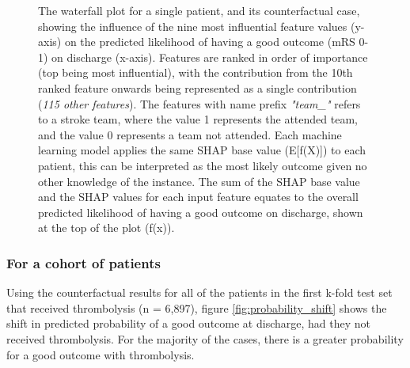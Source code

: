\begin{figure}[h]
\begin{subfigure}[t]{0.5\textwidth}
        \label{fig:rhs_waterfall_without_ivt}
    \end{subfigure}
  \caption{The waterfall plot for a single patient, and its counterfactual case, showing the influence of the nine most influential feature values (y-axis) on the predicted likelihood of having a good outcome (mRS 0-1) on discharge (x-axis). Features are ranked in order of importance (top being most influential), with the contribution from the 10th ranked feature onwards being represented as a single contribution (\textit{115 other features}). The features with name prefix \textit{"team\_"} refers to a stroke team, where the value 1 represents the attended team, and the value 0 represents a team not attended. Each machine learning model applies the same SHAP base value (E[f(X)]) to each patient, this can be interpreted as the most likely outcome given no other knowledge of the instance. The sum of the SHAP base value and the SHAP values for each input feature equates to the overall predicted likelihood of having a good outcome on discharge, shown at the top of the plot (f(x)).}
    \label{fig:double_waterfall}
\end{figure}

\subsubsection{For a cohort of patients}

Using the counterfactual results for all of the patients in the first k-fold test set that received thrombolysis (n = 6,897), figure \ref{fig:probability_shift} shows the shift in predicted probability of a good outcome at discharge, had they not received thrombolysis. For the majority of the cases, there is a greater probability for a good outcome with thrombolysis.

